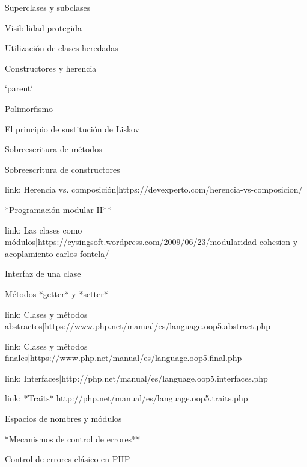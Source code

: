\begin{longenum}
\begin{longenum}
\begin{longenum}
            \item Superclases y subclases
            \item Visibilidad protegida
            \item Utilización de clases heredadas
            \item Constructores y herencia
            \item `parent`
        \end{longenum}
        \item Polimorfismo
        \begin{longenum}
            \item El principio de sustitución de Liskov
            \item Sobreescritura de métodos
            \item Sobreescritura de constructores
        \end{longenum}
        \item [link: Herencia vs. composición|https://devexperto.com/herencia-vs-composicion/]
    \end{longenum}
    \item **Programación modular II**
    \begin{longenum}
        \item [link: Las clases como módulos|https://cysingsoft.wordpress.com/2009/06/23/modularidad-cohesion-y-acoplamiento-carlos-fontela/]
        \begin{longenum}
            \item Interfaz de una clase
            \item Métodos *getter* y *setter*
        \end{longenum}
        \item [link: Clases y métodos abstractos|https://www.php.net/manual/es/language.oop5.abstract.php]
        \item [link: Clases y métodos finales|https://www.php.net/manual/es/language.oop5.final.php]
        \item [link: Interfaces|http://php.net/manual/es/language.oop5.interfaces.php]
        \item [link: *Traits*|http://php.net/manual/es/language.oop5.traits.php]
        \item Espacios de nombres y módulos
    \end{longenum}
    \item **Mecanismos de control de errores**
    \begin{longenum}
        \item Control de errores clásico en PHP

\end{longenum}
\end{longenum}
